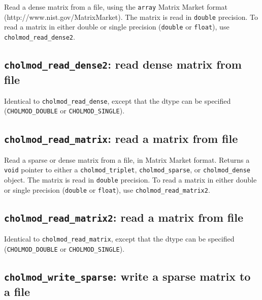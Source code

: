 \documentclass[11pt]{article}
\begin{document}

Read a dense matrix from a file, using the {\tt array} Matrix Market format
\newline (http://www.nist.gov/MatrixMarket).
%
The matrix is read in {\tt double} precision.  To read a matrix
in either double or single precision ({\tt double} or {\tt float}),
use \verb'cholmod_read_dense2'.

\subsection{{\tt cholmod\_read\_dense2}: read dense matrix from file}


Identical to \verb'cholmod_read_dense', except that the dtype can be
specified (\verb'CHOLMOD_DOUBLE' or \verb'CHOLMOD_SINGLE').

\subsection{{\tt cholmod\_read\_matrix}: read a matrix from file}


Read a sparse or dense matrix from a file, in Matrix Market format.  Returns a
{\tt void} pointer to either a {\tt cholmod\_triplet}, {\tt cholmod\_sparse},
or {\tt cholmod\_dense} object.
%
The matrix is read in {\tt double} precision.  To read a matrix
in either double or single precision ({\tt double} or {\tt float}),
use \verb'cholmod_read_matrix2'.

\subsection{{\tt cholmod\_read\_matrix2}: read a matrix from file}


Identical to \verb'cholmod_read_matrix', except that the dtype can be
specified (\verb'CHOLMOD_DOUBLE' or \verb'CHOLMOD_SINGLE').

\subsection{{\tt cholmod\_write\_sparse}: write a sparse matrix to a file}
\end{document}
